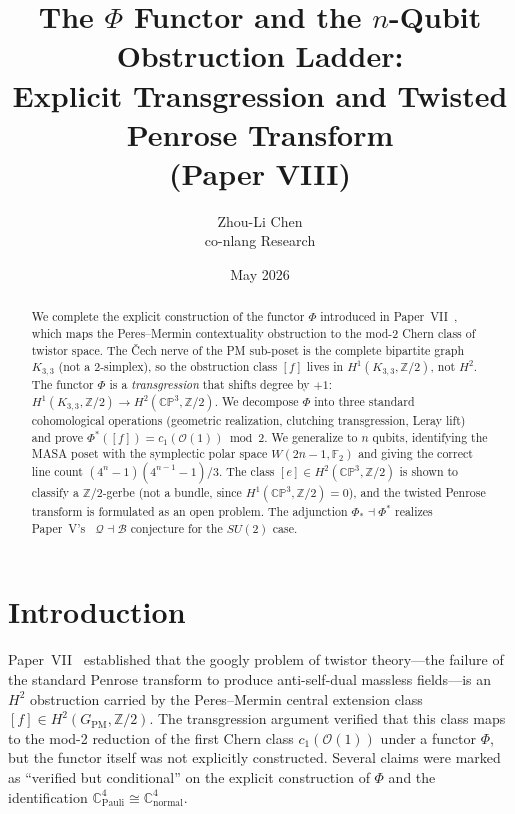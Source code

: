 \documentclass[11pt,a4paper]{article}
\title{The $\Phi$ Functor and the $n$-Qubit Obstruction Ladder:\\
Explicit Transgression and Twisted Penrose Transform\\
{\large (Paper VIII)}}
\author{Zhou-Li Chen \\ co-nlang Research}
\date{May 2026}
\theoremstyle{remark}
\newcommand{\CP}{\mathbb{CP}}
\newcommand{\C}{\mathbb{C}}
\newcommand{\Z}{\mathbb{Z}}
\newcommand{\cO}{\mathcal{O}}
\begin{document}
\maketitle

\begin{abstract}
  We complete the explicit construction of the functor $\Phi$ introduced
  in Paper~VII~\cite{PaperVII}, which maps the Peres--Mermin contextuality
  obstruction to the mod-2 Chern class of twistor space. The \v{C}ech nerve
  of the PM sub-poset is the complete bipartite graph $K_{3,3}$ (not a
  2-simplex), so the obstruction class $[f]$ lives in $H^1(K_{3,3}, \Z/2)$,
  not $H^2$. The functor $\Phi$ is a \emph{transgression} that shifts degree
  by $+1$: $H^1(K_{3,3}, \Z/2) \to H^2(\CP^3, \Z/2)$. We decompose $\Phi$
  into three standard cohomological operations (geometric realization,
  clutching transgression, Leray lift) and prove $\Phi^*([f]) = c_1(\cO(1))
  \bmod 2$. We generalize to $n$ qubits, identifying the MASA poset with
  the symplectic polar space $W(2n-1, \mathbb{F}_2)$ and giving the correct
  line count $(4^n-1)(4^{n-1}-1)/3$. The class $[e] \in H^2(\CP^3, \Z/2)$
  is shown to classify a $\Z/2$-gerbe (not a bundle, since
  $H^1(\CP^3, \Z/2) = 0$), and the twisted Penrose transform is formulated
  as an open problem. The adjunction $\Phi_* \dashv \Phi^*$ realizes
  Paper~V's~\cite{PaperV} $\mathcal{Q} \dashv \mathcal{B}$ conjecture for
  the $SU(2)$ case.
\end{abstract}

\section{Introduction}
\label{sec:intro}

Paper~VII~\cite{PaperVII} established that the googly problem of twistor
theory---the failure of the standard Penrose transform to produce
anti-self-dual massless fields---is an $H^2$ obstruction carried by the
Peres--Mermin central extension class $[f] \in H^2(G_{\text{PM}}, \Z/2)$.
The transgression argument verified that this class maps to the mod-2
reduction of the first Chern class $c_1(\cO(1))$ under a functor $\Phi$,
but the functor itself was not explicitly constructed. Several claims were
marked as ``verified but conditional'' on the explicit construction of
$\Phi$ and the identification $\C^4_{\text{Pauli}} \cong \C^4_{\text{normal}}$.
\end{document}

